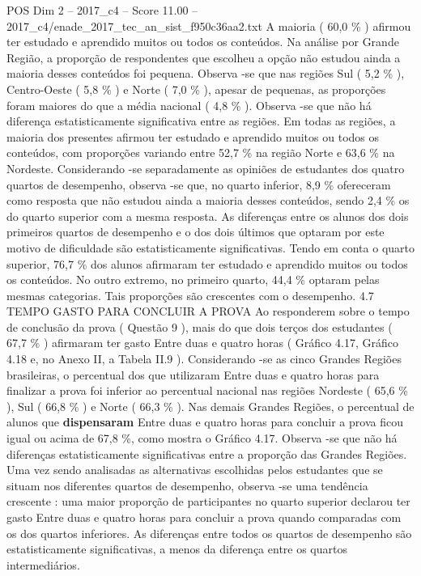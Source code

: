 \begin{textsample}{POS Dim 2 – 2017\_c4 – Score 11.00 – 2017\_c4/enade\_2017\_tec\_an\_sist\_f950c36aa2.txt}
A maioria ( 60,0 \% ) afirmou ter estudado e aprendido muitos ou todos os conteúdos.
Na análise por Grande Região, a proporção de respondentes que escolheu a opção não estudou ainda a maioria desses conteúdos foi pequena.
Observa -se que nas regiões Sul ( 5,2 \% ), Centro-Oeste ( 5,8 \% ) e Norte ( 7,0 \% ), apesar de pequenas, as proporções foram maiores do que a média nacional ( 4,8 \% ).
Observa -se que não há diferença estatisticamente significativa entre as regiões.
Em todas as regiões, a maioria dos presentes afirmou ter estudado e aprendido muitos ou todos os conteúdos, com proporções variando entre 52,7 \% na região Norte e 63,6 \% na Nordeste.
Considerando -se separadamente as opiniões de estudantes dos quatro quartos de desempenho, observa -se que, no quarto inferior, 8,9 \% ofereceram como resposta que não estudou ainda a maioria desses conteúdos, sendo 2,4 \% os do quarto superior com a mesma resposta.
As diferenças entre os alunos dos dois primeiros quartos de desempenho e o dos dois últimos que optaram por este motivo de dificuldade são estatisticamente significativas.
Tendo em conta o quarto superior, 76,7 \% dos alunos afirmaram ter estudado e aprendido muitos ou todos os conteúdos.
No outro extremo, no primeiro quarto, 44,4 \% optaram pelas mesmas categorias.
Tais proporções são crescentes com o desempenho. 4.7 TEMPO GASTO PARA CONCLUIR A PROVA Ao responderem sobre o tempo de conclusão da prova ( Questão 9 ), mais do que dois terços dos estudantes ( 67,7 \% ) afirmaram ter gasto Entre duas e quatro horas ( Gráfico 4.17, Gráfico 4.18 e, no Anexo II, a Tabela II.9 ).
Considerando -se as cinco Grandes Regiões brasileiras, o percentual dos que utilizaram Entre duas e quatro horas para finalizar a prova foi inferior ao percentual nacional nas regiões Nordeste ( 65,6 \% ), Sul ( 66,8 \% ) e Norte ( 66,3 \% ).
Nas demais Grandes Regiões, o percentual de alunos que \textbf{dispensaram} Entre duas e quatro horas para concluir a prova ficou igual ou acima de 67,8 \%, como mostra o Gráfico 4.17.
Observa -se que não há diferenças estatisticamente significativas entre a proporção das Grandes Regiões.
Uma vez sendo analisadas as alternativas escolhidas pelos estudantes que se situam nos diferentes quartos de desempenho, observa -se uma tendência crescente : uma maior proporção de participantes no quarto superior declarou ter gasto Entre duas e quatro horas para concluir a prova quando comparadas com os dos quartos inferiores.
As diferenças entre todos os quartos de desempenho são estatisticamente significativas, a menos da diferença entre os quartos intermediários.

\end{textsample}
